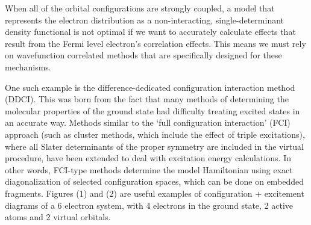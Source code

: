 \documentclass[10pt]{article}
\begin{document}
When all of the orbital configurations are strongly coupled, a model that represents the electron distribution as a non-interacting, single-determinant density functional is not optimal if we want to accurately calculate effects that result from the Fermi level electron's correlation effects. This means we must rely on wavefunction correlated methods that are specifically designed for these mechanisms. 

One such example is the difference-dedicated configuration interaction method (DDCI). This was born from the fact that many methods of determining the molecular properties of the ground state had difficulty treating excited states in an accurate way. Methods similar to the `full configuration interaction' (FCI) approach (such as cluster methods, which include the effect of triple excitations), where all Slater determinants of the proper symmetry are included in the virtual procedure, have been extended to deal with excitation energy calculations. In other words, FCI-type methods determine the model Hamiltonian using exact diagonalization of selected configuration spaces, which can be done on embedded fragments. Figures (1) and (2) are useful examples of configuration + excitement diagrams of a 6 electron system, with 4 electrons in the ground state, 2 active atoms and 2 virtual orbitals.
\end{document}

